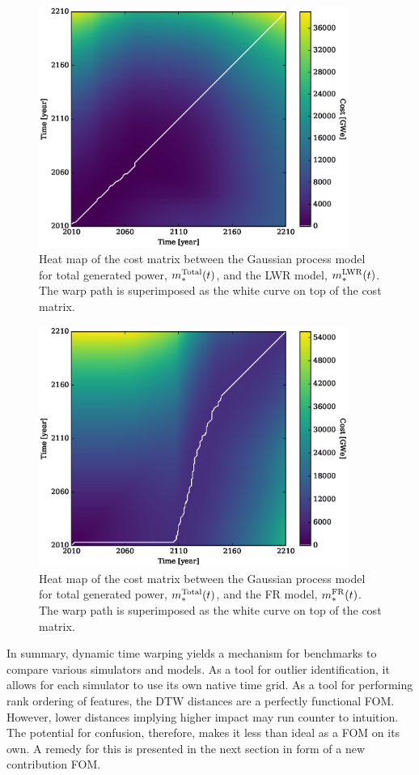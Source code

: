 \begin{figure}[htb]
\centering
\includegraphics[width=0.9\textwidth]{cost-total-model-to-lwr-model.eps}
\caption{Heat map of the cost matrix between the Gaussian process model 
for total generated power, $m_*^{\mathrm{Total}}(t)$, and the LWR model, 
$m_*^{\mathrm{LWR}}(t)$.
The warp path is superimposed as the white curve on top of the cost matrix.}
\label{cost-total-model-to-lwr-model}
\end{figure}

\begin{figure}[htb]
\centering
\includegraphics[width=0.9\textwidth]{cost-total-model-to-fr-model.eps}
\caption{Heat map of the cost matrix between the Gaussian process model 
for total generated power, $m_*^{\mathrm{Total}}(t)$, and the FR model, 
$m_*^{\mathrm{FR}}(t)$.
The warp path is superimposed as the white curve on top of the cost matrix.}
\label{cost-total-model-to-fr-model}
\end{figure}

In summary, dynamic time warping yields a mechanism for benchmarks to 
compare various simulators and models. As a tool for
outlier identification, it allows for each simulator to use its own native 
time grid. As a tool for performing rank ordering of features, the DTW distances
are a perfectly functional FOM. However, lower distances implying higher 
impact may run counter to intuition. The potential for confusion, therefore,
makes it less than ideal as a FOM on its own. A remedy for this is presented
in the next section in form of a new contribution FOM.

